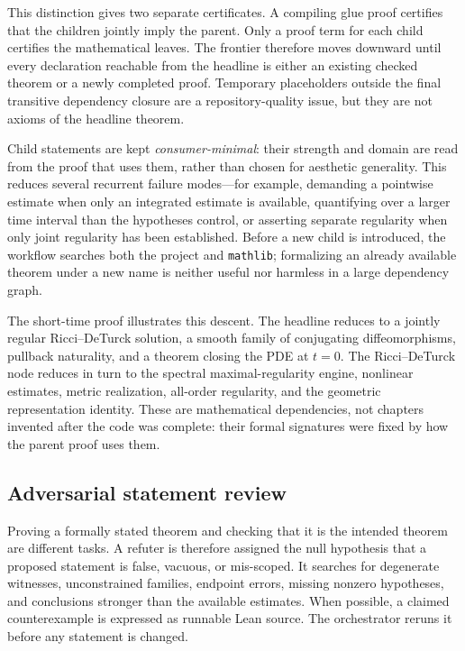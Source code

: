 \documentclass[11pt]{article}
\theoremstyle{plain}
\theoremstyle{definition}
\theoremstyle{remark}
\begin{document}
This distinction gives two separate certificates.  A compiling glue proof
certifies that the children jointly imply the parent.  Only a proof term for
each child certifies the mathematical leaves.  The frontier therefore moves
downward until every declaration reachable from the headline is either an
existing checked theorem or a newly completed proof.  Temporary placeholders
outside the final transitive dependency closure are a repository-quality
issue, but they are not axioms of the headline theorem.

Child statements are kept \emph{consumer-minimal}: their strength and domain
are read from the proof that uses them, rather than chosen for aesthetic
generality.  This reduces several recurrent failure modes---for example,
demanding a pointwise estimate when only an integrated estimate is available,
quantifying over a larger time interval than the hypotheses control, or
asserting separate regularity when only joint regularity has been established.
Before a new child is introduced, the workflow searches both the project and
\texttt{mathlib}; formalizing an already available theorem under a new name is
neither useful nor harmless in a large dependency graph.

The short-time proof illustrates this descent.  The headline reduces to a
jointly regular Ricci--DeTurck solution, a smooth family of conjugating
diffeomorphisms, pullback naturality, and a theorem closing the PDE at $t=0$.
The Ricci--DeTurck node reduces in turn to the spectral maximal-regularity
engine, nonlinear estimates, metric realization, all-order regularity, and the
geometric representation identity.  These are mathematical dependencies, not
chapters invented after the code was complete: their formal signatures were
fixed by how the parent proof uses them.

\subsection{Adversarial statement review}

Proving a formally stated theorem and checking that it is the intended theorem
are different tasks.  A refuter is therefore assigned the null hypothesis that
a proposed statement is false, vacuous, or mis-scoped.  It searches for
degenerate witnesses, unconstrained families, endpoint errors, missing
nonzero hypotheses, and conclusions stronger than the available estimates.
When possible, a claimed counterexample is expressed as runnable Lean source.
The orchestrator reruns it before any statement is changed.
\end{document}
